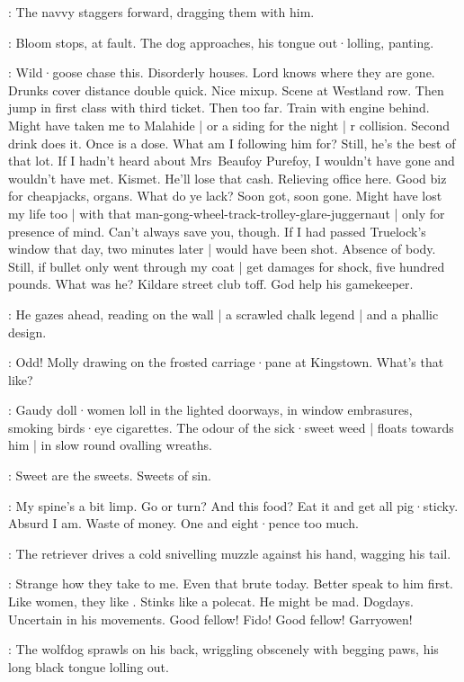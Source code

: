 :
The navvy staggers forward,
dragging them with him.

:
Bloom stops,
at fault.
The dog approaches,
his tongue out·lolling,
panting.

\Bloom:
Wild·goose chase this.
Disorderly houses.
Lord knows where they are gone.
Drunks cover distance double quick.
Nice mixup.
Scene at Westland row.
Then jump in first class with third ticket.
Then too far.
Train with engine behind.
Might have taken me to Malahide |
or a siding for the night  |
r collision.
Second drink does it.
Once is a dose.
What am I following him for?
Still,
he's the best of that lot.
If I hadn't heard about Mrs~Beaufoy Purefoy,
I wouldn't have gone and wouldn't have met.
Kismet.
He'll lose that cash.
Relieving office here.
Good biz for cheapjacks,
organs.
What do ye lack?
Soon got,
soon gone.
Might have lost my life too |
with that man-gong-wheel-track-trolley-glare-juggernaut |
only for presence of mind.
Can't always save you,
though.
If I had passed Truelock's window that day,
two minutes later |
would have been shot.
Absence of body.
Still,
if bullet only went through my coat |
get damages for shock,
five hundred pounds.
What was he?
Kildare street club toff.
God help his gamekeeper.

:
He gazes ahead,
reading on the wall |
a scrawled chalk legend  |
and a phallic design.

\Bloom:
%
Odd!
Molly drawing on the frosted carriage·pane at Kingstown.
What's that like?

:
Gaudy doll·women loll in the lighted doorways,
in window embrasures,
smoking birds·eye cigarettes.
The odour of the sick·sweet weed |
floats towards him |
in slow round ovalling wreaths.

\Wreaths:
Sweet are the sweets.
Sweets of sin.

\Bloom:
My spine's a bit limp.
Go or turn?
And this food?
Eat it and get all pig·sticky.
Absurd I am.
Waste of money.
One and eight·pence too much.

:
The retriever drives a cold snivelling muzzle against his hand,
wagging his tail.

\Bloom:
Strange how they take to me.
Even that brute today.
Better speak to him first.
Like women,
they like .
Stinks like a polecat.
He might be mad.
Dogdays.
Uncertain in his movements.
Good fellow!
Fido!
Good fellow!
Garryowen!

:
The wolfdog sprawls on his back,
wriggling obscenely with begging paws,
his long black tongue lolling out.


